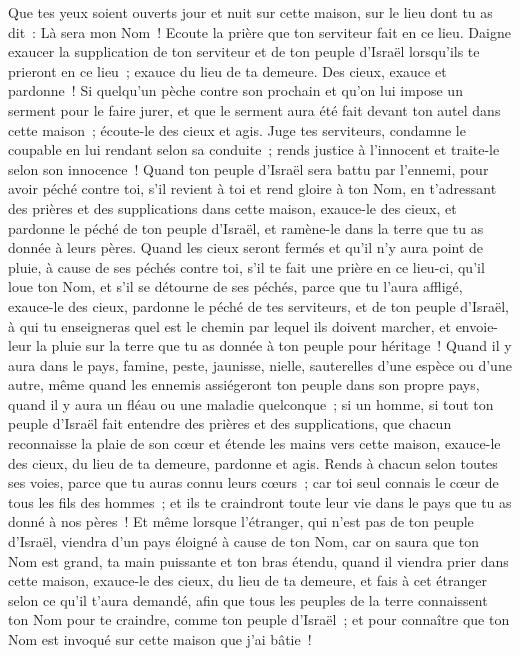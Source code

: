 \begin{multicols}{2}
Que tes yeux soient ouverts jour et nuit sur cette maison, sur le lieu dont tu as dit~: Là sera mon Nom~! Ecoute la prière que ton serviteur fait en ce lieu.
Daigne exaucer la supplication de ton serviteur et de ton peuple d'Israël lorsqu'ils te prieront en ce lieu~; exauce du lieu de ta demeure. Des cieux, exauce et pardonne~!
Si quelqu'un pèche contre son prochain et qu'on lui impose un serment pour le faire jurer, et que le serment aura été fait devant ton autel dans cette maison~;
écoute-le des cieux et agis. Juge tes serviteurs, condamne le coupable en lui rendant selon sa conduite~; rends justice à l'innocent et traite-le selon son innocence~!
Quand ton peuple d'Israël sera battu par l'ennemi, pour avoir péché contre toi, s'il revient à toi et rend gloire à ton Nom, en t'adressant des prières et des supplications dans cette maison,
exauce-le des cieux, et pardonne le péché de ton peuple d'Israël, et ramène-le dans la terre que tu as donnée à leurs pères.
Quand les cieux seront fermés et qu'il n'y aura point de pluie, à cause de ses péchés contre toi, s'il te fait une prière en ce lieu-ci, qu'il loue ton Nom, et s'il se détourne de ses péchés, parce que tu l'aura affligé,
exauce-le des cieux, pardonne le péché de tes serviteurs, et de ton peuple d'Israël, à qui tu enseigneras quel est le chemin par lequel ils doivent marcher, et envoie-leur la pluie sur la terre que tu as donnée à ton peuple pour héritage~!
Quand il y aura dans le pays, famine, peste, jaunisse, nielle, sauterelles d'une espèce ou d'une autre, même quand les ennemis assiégeront ton peuple dans son propre pays, quand il y aura un fléau ou une maladie quelconque~;
si un homme, si tout ton peuple d'Israël fait entendre des prières et des supplications, que chacun reconnaisse la plaie de son cœur et étende les mains vers cette maison,
exauce-le des cieux, du lieu de ta demeure, pardonne et agis. Rends à chacun selon toutes ses voies, parce que tu auras connu leurs cœurs~; car toi seul connais le cœur de tous les fils des hommes~;
et ils te craindront toute leur vie dans le pays que tu as donné à nos pères~!
Et même lorsque l'étranger, qui n'est pas de ton peuple d'Israël, viendra d'un pays éloigné à cause de ton Nom,
car on saura que ton Nom est grand, ta main puissante et ton bras étendu, quand il viendra prier dans cette maison,
exauce-le des cieux, du lieu de ta demeure, et fais à cet étranger selon ce qu'il t'aura demandé, afin que tous les peuples de la terre connaissent ton Nom pour te craindre, comme ton peuple d'Israël~; et pour connaître que ton Nom est invoqué sur cette maison que j'ai bâtie~!

\end{multicols}
